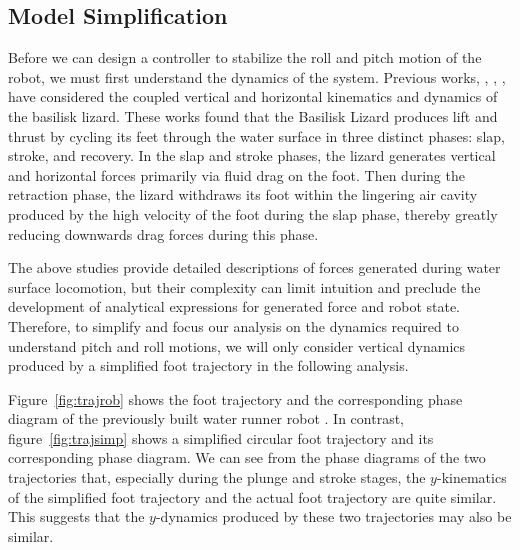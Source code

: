 \subsection{Model Simplification}

Before we can design a controller to stabilize the roll and pitch motion of the robot, we must first understand the dynamics of the system. Previous works, \cite{glasheen1996hydrodynamic}, \cite{floyd2008design}, \cite{hsieh2004running}, have considered the coupled vertical and horizontal kinematics and dynamics of the basilisk lizard. These works found that the Basilisk Lizard produces lift and thrust by cycling its feet through the water surface in three distinct phases: slap, stroke, and recovery. In the slap and stroke phases, the lizard generates vertical and horizontal forces primarily via fluid drag on the foot. Then during the retraction phase, the lizard withdraws its foot within the lingering air cavity produced by the high velocity of the foot during the slap phase, thereby greatly reducing downwards drag forces during this phase. 

The above studies provide detailed descriptions of forces generated during water surface locomotion, but their complexity can limit intuition and preclude the development of analytical expressions for generated force and robot state.  Therefore, to simplify and focus our analysis on the dynamics required to understand pitch and roll motions, we will only consider vertical dynamics produced by a simplified foot trajectory in the following analysis. 

Figure~\ref{fig:trajrob} shows the foot trajectory  and the corresponding phase diagram of the previously built water runner robot \cite{park2010roll}. In contrast, figure~\ref{fig:trajsimp} shows a simplified circular foot trajectory and its corresponding phase diagram. We can see from the phase diagrams of the two trajectories that, especially during the plunge and stroke stages, the $y$-kinematics of the simplified foot trajectory and the actual foot trajectory are quite similar. This suggests that the $y$-dynamics produced by these two trajectories may also be similar.

